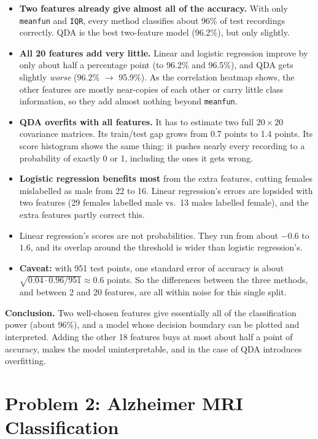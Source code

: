 \documentclass[11pt]{article}
\begin{document}
\begin{itemize}
  \item \textbf{Two features already give almost all of the accuracy.} With only
  \texttt{meanfun} and \texttt{IQR}, every method classifies about 96\% of test recordings
  correctly. QDA is the best two-feature model (96.2\%), but only slightly.
  \item \textbf{All 20 features add very little.} Linear and logistic regression improve by
  only about half a percentage point (to 96.2\% and 96.5\%), and QDA gets slightly
  \emph{worse} (96.2\% $\to$ 95.9\%). As the correlation heatmap shows, the other features
  are mostly near-copies of each other or carry little class information, so they add almost
  nothing beyond \texttt{meanfun}.
  \item \textbf{QDA overfits with all features.} It has to estimate two full $20 \times 20$
  covariance matrices. Its train/test gap grows from 0.7 points to 1.4 points. Its score
  histogram shows the same thing: it pushes nearly every recording to a probability of
  exactly 0 or 1, including the ones it gets wrong.
  \item \textbf{Logistic regression benefits most} from the extra features, cutting females
  mislabelled as male from 22 to 16. Linear regression's errors are lopsided with two
  features (29 females labelled male vs.\ 13 males labelled female), and the extra features
  partly correct this.
  \item Linear regression's scores are not probabilities. They run from about $-0.6$ to
  $1.6$, and its overlap around the threshold is wider than logistic regression's.
  \item \textbf{Caveat:} with 951 test points, one standard error of accuracy is about
  $\sqrt{0.04 \cdot 0.96 / 951} \approx 0.6$ points. So the differences between the three
  methods, and between 2 and 20 features, are all within noise for this single split.
\end{itemize}

\textbf{Conclusion.} Two well-chosen features give essentially all of the classification
power (about 96\%), and a model whose decision boundary can be plotted and interpreted.
Adding the other 18 features buys at most about half a point of accuracy, makes the model
uninterpretable, and in the case of QDA introduces overfitting.

\clearpage
\section*{Problem 2: Alzheimer MRI Classification}
\end{document}
